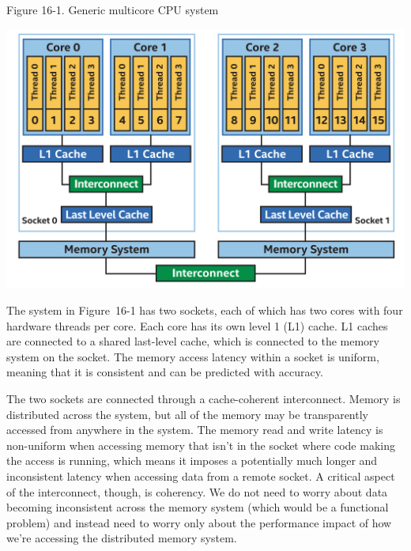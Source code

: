 \hspace*{\fill} \par %
Figure 16-1. Generic multicore CPU system
\begin{center}
	\includegraphics[width=1.0\textwidth]{content/chapter-16/images/2}
\end{center}

The system in Figure 16-1 has two sockets, each of which has two cores with four hardware threads per core. Each core has its own level 1 (L1) cache. L1 caches are connected to a shared last-level cache, which is connected to the memory system on the socket. The memory access latency within a socket is uniform, meaning that it is consistent and can be predicted with accuracy.\par

The two sockets are connected through a cache-coherent interconnect. Memory is distributed across the system, but all of the memory may be transparently accessed from anywhere in the system. The memory read and write latency is non-uniform when accessing memory that isn’t in the socket where code making the access is running, which means it imposes a potentially much longer and inconsistent latency when accessing data from a remote socket. A critical aspect of the interconnect, though, is coherency. We do not need to worry about data becoming inconsistent across the memory system (which would be a functional problem) and instead need to worry only about the performance impact of how we’re accessing the distributed memory system.\par


